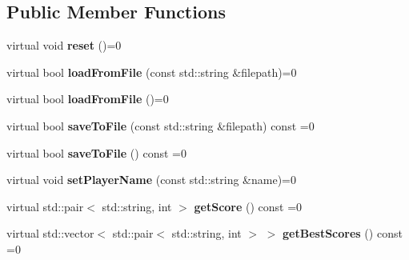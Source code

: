 \subsection*{Public Member Functions}
\begin{DoxyCompactItemize}
\item 
\mbox{\label{classArcade_1_1Games_1_1IGameModule_a8934b25efb3c948c8b3be7caa141626d}} 
virtual void {\bfseries reset} ()=0
\item 
\mbox{\label{classArcade_1_1Games_1_1IGameModule_a2a8cdd7c90677b6ebd0f97d99254d256}} 
virtual bool {\bfseries load\+From\+File} (const std\+::string \&filepath)=0
\item 
\mbox{\label{classArcade_1_1Games_1_1IGameModule_add4c3468c03cc41fde2baf671a4bd026}} 
virtual bool {\bfseries load\+From\+File} ()=0
\item 
\mbox{\label{classArcade_1_1Games_1_1IGameModule_a3cf053ce2f4ccfe13e9c10d8549f7c82}} 
virtual bool {\bfseries save\+To\+File} (const std\+::string \&filepath) const =0
\item 
\mbox{\label{classArcade_1_1Games_1_1IGameModule_ada0aa1d3d52bcdedcdb35b95d956c8ee}} 
virtual bool {\bfseries save\+To\+File} () const =0
\item 
\mbox{\label{classArcade_1_1Games_1_1IGameModule_aad433296fe8a4582ebfdad5827a13d59}} 
virtual void {\bfseries set\+Player\+Name} (const std\+::string \&name)=0
\item 
\mbox{\label{classArcade_1_1Games_1_1IGameModule_ad84a0b04bb998a4eb3682c76d0fababf}} 
virtual std\+::pair$<$ std\+::string, int $>$ {\bfseries get\+Score} () const =0
\item 
\mbox{\label{classArcade_1_1Games_1_1IGameModule_afaec4931b0051ba589fbe1b14d20131b}} 
virtual std\+::vector$<$ std\+::pair$<$ std\+::string, int $>$ $>$ {\bfseries get\+Best\+Scores} () const =0
\item 
\mbox{\label{classArcade_1_1Games_1_1IGameModule_a421d1064fcc112dfc7ea025fc7f88aa7}} 

\end{DoxyCompactItemize}
